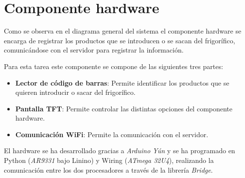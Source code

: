 \section{Componente hardware}

Como se observa en el diagrama general del sistema el componente hardware se encarga de registrar los productos que se introducen o se sacan del frigorífico, comunicándose con el servidor para registrar la información.

Para esta tarea este componente se compone de las siguientes tres partes:

\begin{itemize}
    \item \textbf{Lector de código de barras}: Permite identificar los productos que se quieren introducir o sacar del frigorífico.
    \item \textbf{Pantalla TFT}: Permite controlar las distintas opciones del componente hardware.
    \item \textbf{Comunicación WiFi}: Permite la comunicación con el servidor.
\end{itemize}

El hardware se ha desarrollado gracias a \emph{Arduino Yún} y se ha programado en Python (\emph{AR9331} bajo Linino) y Wiring (\emph{ATmega 32U4}), realizando la comunicación entre los dos procesadores a través de la librería \emph{Bridge}.